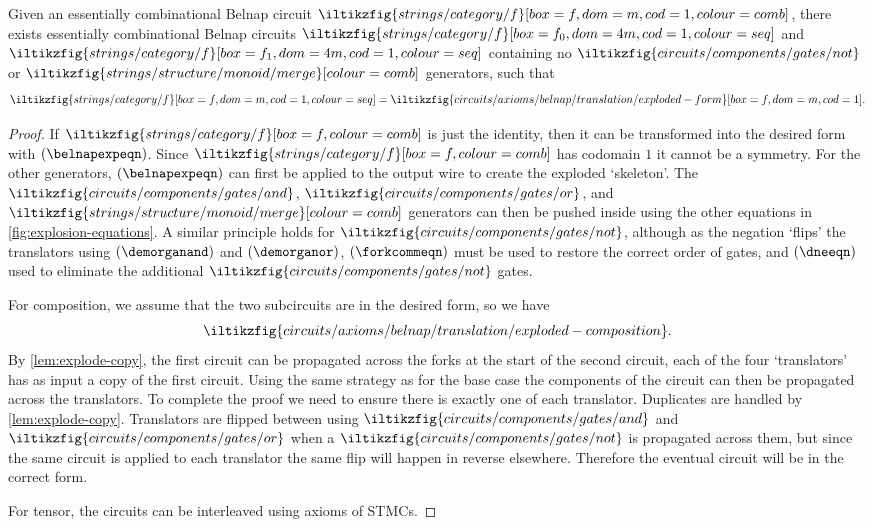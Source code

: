 \begin{proposition}\label{prop:exploded-belnap}
    Given an essentially combinational Belnap circuit \(
    \iltikzfig{strings/category/f}[box=f,dom=m,cod=1,colour=comb]
    \), there exists essentially combinational Belnap circuits \(
    \iltikzfig{strings/category/f}[box=f_0,dom=4m,cod=1,colour=seq]
    \) and \(
    \iltikzfig{strings/category/f}[box=f_1,dom=4m,cod=1,colour=seq]
    \) containing no \(
    \iltikzfig{circuits/components/gates/not}
    \) or \(
    \iltikzfig{strings/structure/monoid/merge}[colour=comb]
    \) generators, such that \[
        \iltikzfig{strings/category/f}[box=f,dom=m,cod=1,colour=seq]
        =
        \iltikzfig{circuits/axioms/belnap/translation/exploded-form}[box=f,dom=m,cod=1].
    \]
\end{proposition}
\begin{proof}
    If \(\iltikzfig{strings/category/f}[box=f,colour=comb]\) is just
    the identity, then it can be transformed into the desired form with
    \((\belnapexpeqn)\).
    Since \(\iltikzfig{strings/category/f}[box=f,colour=comb]\) has codomain
    \(1\) it cannot be a symmetry.
    For the other generators, \((\belnapexpeqn)\) can first be applied
    to the output wire to create the exploded `skeleton'.
    The \(
    \iltikzfig{circuits/components/gates/and}
    \), \(
    \iltikzfig{circuits/components/gates/or}
    \), and \(
    \iltikzfig{strings/structure/monoid/merge}[colour=comb]
    \) generators can then be pushed inside using the other equations in
    \cref{fig:explosion-equations}.
    A similar principle holds for \(
    \iltikzfig{circuits/components/gates/not}
    \), although as the negation `flips' the translators using
    \((\demorganand)\) and \((\demorganor)\), \((\forkcommeqn)\) must be used to
    restore the correct order of gates, and \((\dneeqn)\) used to eliminate the
    additional \(\iltikzfig{circuits/components/gates/not}\) gates.

    For composition, we assume that the two subcircuits are in the desired form,
    so we have \[
        \iltikzfig{circuits/axioms/belnap/translation/exploded-composition}.
    \]
    By \cref{lem:explode-copy}, the first circuit can be propagated across
    the forks at the start of the second circuit, each of the four
    `translators' has as input a copy of the first circuit.
    Using the same strategy as for the base case the components of the circuit
    can then be propagated across the translators.
    To complete the proof we need to ensure there is exactly one of each
    translator.
    Duplicates are handled by \cref{lem:explode-copy}.
    Translators are flipped between using \(
    \iltikzfig{circuits/components/gates/and}
    \) and \(
    \iltikzfig{circuits/components/gates/or}
    \) when a \(\iltikzfig{circuits/components/gates/not}\) is propagated across
    them, but since the same circuit is applied to each translator the same
    flip will happen in reverse elsewhere.
    Therefore the eventual circuit will be in the correct form.

    For tensor, the circuits can be interleaved using axioms of STMCs.
\end{proof}

